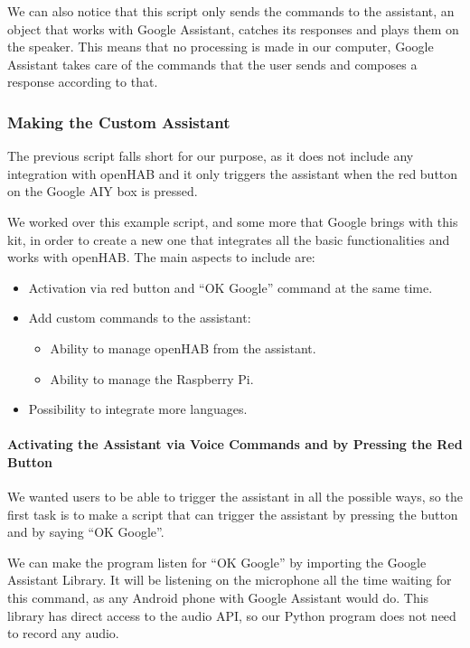 We can also notice that this script only sends the commands to the assistant, an object that works with Google Assistant, catches
its responses and plays them on the speaker. This means that no processing is made in our computer, Google Assistant takes care
of the commands that the user sends and composes a response according to that.

\subsubsection{Making the Custom Assistant}
The previous script falls short for our purpose, as it does not include any integration with openHAB and it only triggers the
assistant when the red button on the Google AIY box is pressed.

We worked over this example script, and some more that Google brings with this kit, in order to create a new one that integrates
all the basic functionalities and works with openHAB. The main aspects to include are:
\begin{itemize}
    \item Activation via red button and “OK Google” command at the same time.
    \item Add custom commands to the assistant:
    \begin{itemize}
        \item Ability to manage openHAB from the assistant.
        \item Ability to manage the Raspberry Pi.
    \end{itemize}
    \item Possibility to integrate more languages.
\end{itemize}

\paragraph{Activating the Assistant via Voice Commands and by Pressing the Red Button}
We wanted users to be able to trigger the assistant in all the possible ways, so the first task is to make a script that can trigger
the assistant by pressing the button and by saying “OK Google”.

We can make the program listen for “OK Google” by importing the Google Assistant Library. It will be listening on the microphone
all the time waiting for this command, as any Android phone with Google Assistant would do. This library has direct access to the
audio API, so our Python program does not need to record any audio.

